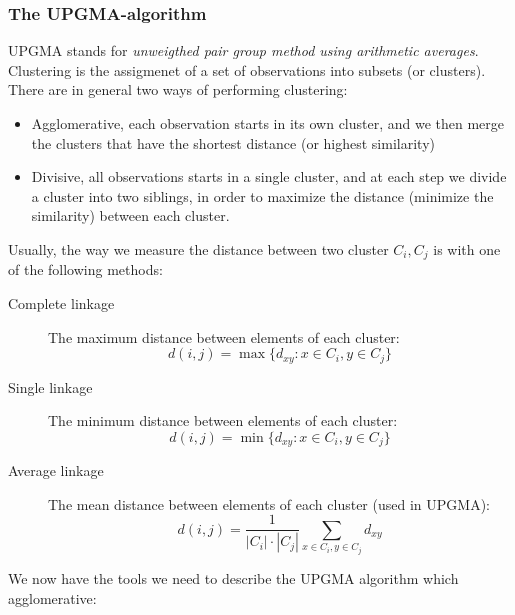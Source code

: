     \subsubsection{The UPGMA-algorithm}
    UPGMA stands for \textit{unweigthed pair group method using arithmetic 
    averages}. Clustering is the assigmenet of a set of observations into 
    subsets (or clusters). There are in general two ways of performing 
    clustering:
    \begin{itemize}
        \item Agglomerative, each observation starts in its own cluster, and we 
        then merge the clusters that have the shortest distance (or highest 
        similarity)
        \item Divisive, all observations starts in a single cluster, and at 
        each step we divide a cluster into two siblings, in order to maximize 
        the distance (minimize the similarity) between each cluster.
    \end{itemize}
    Usually, the way we measure the distance between two cluster $C_i,C_j$ is 
    with one of the following methods:
    \begin{description}
        \item[Complete linkage] The maximum distance between elements of each 
        cluster:
        \begin{equation*}
            d(i,j)=\max\{d_{xy} : x \in C_i, y\in C_j\}
        \end{equation*}
        \item[Single linkage] The minimum distance between elements of each 
        cluster:
        \begin{equation*}
            d(i,j)=\min\{d_{xy} : x \in C_i, y\in C_j\}
        \end{equation*}
        \item[Average linkage] The mean distance between elements of each 
        cluster (used in UPGMA):
        \begin{equation*}
            d(i,j) = \frac{1}{|C_i| \cdot |C_j|}\sum_{x\in C_i, y \in C_j}d_{xy}
        \end{equation*}
    \end{description}
    
    We now have the tools we need to describe the UPGMA algorithm which 
    agglomerative:
    
